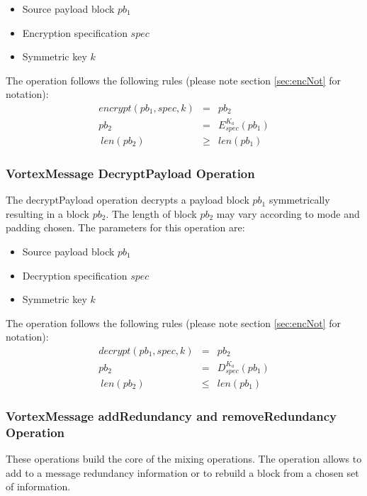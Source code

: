 \begin{itemize}
	\item Source payload block $pb_1$
	\item Encryption specification $spec$
	\item Symmetric key $k$
\end{itemize}

The operation follows the following rules (please note section \ref{sec:encNot} for notation):
\begin{eqnarray}
encrypt(pb_1, spec, k) & = & pb_2 \\
pb_2 & = & E_{spec}^{K_a}\left( pb_1 \right)\\\
len(pb_2) & \geq & len(pb_1)
\end{eqnarray}


\subsubsection{VortexMessage DecryptPayload Operation}
The decryptPayload operation decrypts a payload block $pb_1$ symmetrically resulting in a block $pb_2$. The length of block $pb_2$ may vary according to mode and padding chosen. The parameters for this operation are:

\begin{itemize}
	\item Source payload block $pb_1$
	\item Decryption specification $spec$
	\item Symmetric key $k$
\end{itemize}

The operation follows the following rules (please note section \ref{sec:encNot} for notation):
\begin{eqnarray}
decrypt(pb_1, spec, k) & = & pb_2 \\
pb_2 & = & D_{spec}^{K_a}\left( pb_1 \right)\\\
len(pb_2) & \leq & len(pb_1)
\end{eqnarray}

\subsubsection{VortexMessage addRedundancy and removeRedundancy Operation}
These operations build the core of the mixing operations. The operation allows to add to a message redundancy information or to rebuild a block from a chosen set of information. 

